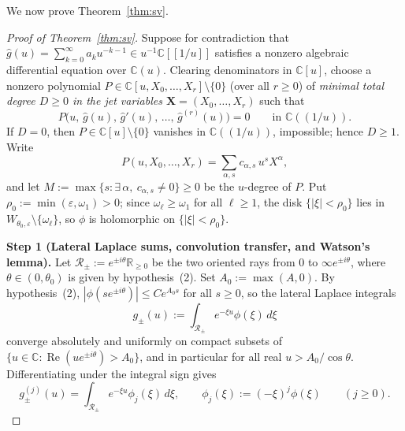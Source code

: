 \documentclass[10pt,reqno]{amsart}
\numberwithin{equation}{section}
\theoremstyle{definition}
\newcommand{\R}{\mathbb{R}}
\newcommand{\C}{\mathbb{C}}
\newcommand{\cR}{\mathcal{R}}
\DeclareMathOperator{\RePart}{Re}
\renewcommand{\Re}{\RePart}
\begin{document}
We now prove Theorem~\ref{thm:sv}.

\begin{proof}[Proof of Theorem~\ref{thm:sv}]
Suppose for contradiction that $\widehat{g}(u) = \sum_{k=0}^\infty a_k u^{-k-1} \in u^{-1}\C[[1/u]]$ satisfies a nonzero algebraic differential equation over $\C(u)$. Clearing denominators in $\C[u]$, choose a nonzero polynomial $P \in \C[u, X_0, \dots, X_r] \setminus \{0\}$ (over all $r \ge 0$) of \emph{minimal total degree $D \ge 0$ in the jet variables $\mathbf{X} = (X_0, \dots, X_r)$} such that
\begin{equation}\label{eq:P-hat-g-zero}
  P\bigl(u,\, \widehat{g}(u),\, \widehat{g}'(u),\, \dots,\, \widehat{g}^{(r)}(u)\bigr) = 0 \qquad \text{in } \C((1/u)).
\end{equation}
If $D = 0$, then $P \in \C[u] \setminus \{0\}$ vanishes in $\C((1/u))$, impossible; hence $D \ge 1$. Write
\[
  P(u, X_0, \dots, X_r) = \sum_{\alpha, s} c_{\alpha, s}\, u^s X^\alpha,
\]
and let $M := \max\{s : \exists\,\alpha,\ c_{\alpha,s} \neq 0\} \ge 0$ be the $u$-degree of $P$. Put $\rho_0 := \min(\varepsilon, \omega_1) > 0$; since $\omega_\ell \ge \omega_1$ for all $\ell \ge 1$, the disk $\{|\xi| < \rho_0\}$ lies in $W_{\theta_0,\varepsilon} \setminus \{\omega_\ell\}$, so $\phi$ is holomorphic on $\{|\xi| < \rho_0\}$.

\smallskip
\noindent\textbf{Step 1 (Lateral Laplace sums, convolution transfer, and Watson's lemma).}
Let $\cR_\pm := e^{\pm i\theta}\R_{\ge 0}$ be the two oriented rays from $0$ to $\infty e^{\pm i\theta}$, where $\theta \in (0, \theta_0)$ is given by hypothesis~(2). Set $A_0 := \max(A, 0)$. By hypothesis~(2), $|\phi(s e^{\pm i\theta})| \le C e^{A_0 s}$ for all $s \ge 0$, so the lateral Laplace integrals
\[
  g_\pm(u) := \int_{\cR_\pm} e^{-\xi u} \phi(\xi)\,d\xi
\]
converge absolutely and uniformly on compact subsets of $\{u \in \C : \Re(u e^{\pm i\theta}) > A_0\}$, and in particular for all real $u > A_0 / \cos\theta$. Differentiating under the integral sign gives
\[
  g_\pm^{(j)}(u) = \int_{\cR_\pm} e^{-\xi u} \phi_j(\xi)\,d\xi, \qquad \phi_j(\xi) := (-\xi)^j \phi(\xi) \qquad (j \ge 0).
\]


\end{proof}
\end{document}
